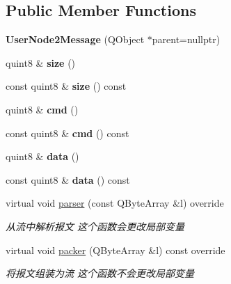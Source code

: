\subsection*{Public Member Functions}
\begin{DoxyCompactItemize}
\item 
\mbox{\label{class_user_node2_message_a663e79115da42b78e7e46afa3dd09d94}} 
{\bfseries User\+Node2\+Message} (Q\+Object $\ast$parent=nullptr)
\item 
\mbox{\label{class_user_node2_message_aee243ee45d1f4ff6a3230c82bcad530e}} 
quint8 \& {\bfseries size} ()
\item 
\mbox{\label{class_user_node2_message_a64e5ff433ca61321b8dd81b4690a49fc}} 
const quint8 \& {\bfseries size} () const
\item 
\mbox{\label{class_user_node2_message_a40e9d0960f3cb2bb046fd2841372d1c7}} 
quint8 \& {\bfseries cmd} ()
\item 
\mbox{\label{class_user_node2_message_aa51164b7361afd63d7a97beed61fde6d}} 
const quint8 \& {\bfseries cmd} () const
\item 
\mbox{\label{class_user_node2_message_a6ce4d5b771f03f48aece13e82271768f}} 
quint8 \& {\bfseries data} ()
\item 
\mbox{\label{class_user_node2_message_aec24f346b33c90b0a8c1bfb4699d0a18}} 
const quint8 \& {\bfseries data} () const
\item 
virtual void \mbox{\hyperlink{class_user_node2_message_a306cfbfe2a1e9c226f16d5b76331c3bd}{parser}} (const Q\+Byte\+Array \&l) override
\begin{DoxyCompactList}\small\item\em 从流中解析报文 这个函数会更改局部变量 \end{DoxyCompactList}\item 
virtual void \mbox{\hyperlink{class_user_node2_message_a4dfa598c963421cfecc686cd9d94724c}{packer}} (Q\+Byte\+Array \&l) const override
\begin{DoxyCompactList}\small\item\em 将报文组装为流 这个函数不会更改局部变量 \end{DoxyCompactList}\end{DoxyCompactItemize}



